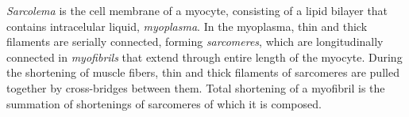 
\emph{Sarcolema} is the cell membrane of a myocyte, consisting of a lipid bilayer that contains intracelular liquid, \emph{myoplasma}. In the myoplasma, thin and thick filaments are serially connected, forming \emph{sarcomeres}, which are longitudinally connected in \emph{myofibrils} that extend through entire length of the myocyte. During the shortening of muscle fibers, thin and thick filaments of sarcomeres are pulled together by cross-bridges between them. Total shortening of a myofibril is the summation of shortenings of sarcomeres of which it is composed.

